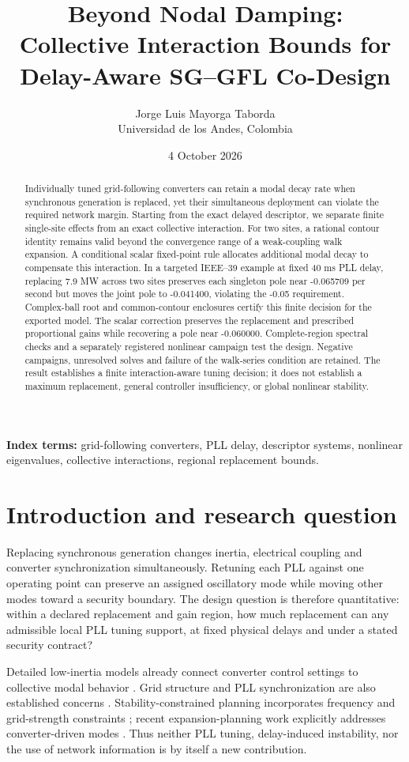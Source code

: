 \documentclass[11pt]{article}
\title{Beyond Nodal Damping:\\Collective Interaction Bounds for Delay-Aware SG--GFL Co-Design}
\author{Jorge Luis Mayorga Taborda\\Universidad de los Andes, Colombia}
\date{4 October 2026}
\begin{document}
\maketitle
\begin{abstract}
Individually tuned grid-following converters can retain a modal decay rate
when synchronous generation is replaced, yet their simultaneous deployment
can violate the required network margin. Starting from the exact delayed
descriptor, we separate finite single-site effects from an exact collective
interaction. For two sites, a rational contour identity remains valid beyond
the convergence range of a weak-coupling walk expansion. A conditional scalar
fixed-point rule allocates additional modal decay to compensate this interaction.
In a targeted IEEE--39 example at fixed 40 ms PLL delay, replacing 7.9 MW
across two sites preserves each singleton pole near -0.065709 per second but
moves the joint pole to -0.041400, violating the -0.05 requirement. Complex-ball
root and common-contour enclosures certify this finite decision for the exported
model. The scalar correction preserves the replacement and prescribed
proportional gains while recovering a pole near -0.060000. Complete-region
spectral checks and a separately registered nonlinear campaign test the design.
Negative campaigns, unresolved solves and failure of the walk-series condition
are retained. The result establishes a finite interaction-aware tuning decision;
it does not establish a maximum replacement, general controller insufficiency,
or global nonlinear stability.
\end{abstract}
\noindent\textbf{Index terms:} grid-following converters, PLL delay,
descriptor systems, nonlinear eigenvalues, collective interactions,
regional replacement bounds.

\section{Introduction and research question}
Replacing synchronous generation changes inertia, electrical coupling
and converter synchronization simultaneously. Retuning each PLL against
one operating point can preserve an assigned oscillatory mode while
moving other modes toward a security boundary. The design question is
therefore quantitative: within a declared replacement and gain region,
how much replacement can any admissible local PLL tuning support,
at fixed physical delays and under a stated security contract?

Detailed low-inertia models already connect converter control settings
to collective modal behavior \cite{markovic}. Grid structure and PLL
synchronization are also established concerns \cite{huang}.
Stability-constrained planning incorporates frequency and grid-strength
constraints \cite{chuteng}; recent expansion-planning work explicitly
addresses converter-driven modes \cite{jia}. Thus neither PLL tuning,
delay-induced instability, nor the use of network information is by
itself a new contribution.
\end{document}
